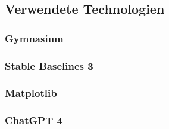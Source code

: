 \subsection{Verwendete Technologien}
\subsubsection{Gymnasium}
\subsubsection{Stable Baselines 3}
\subsubsection{Matplotlib}
\subsubsection{ChatGPT 4}